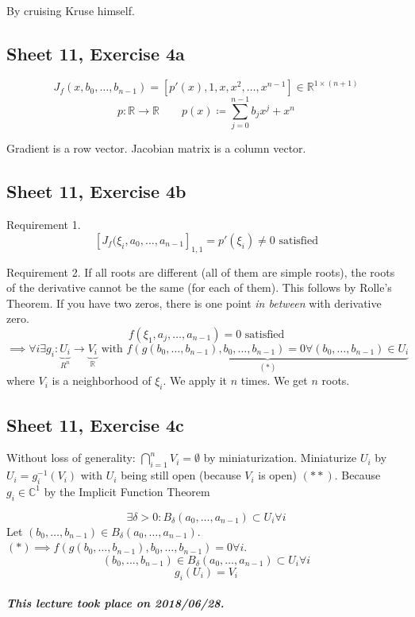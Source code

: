 \documentclass{article}
\newcommand{\dateref}[1]{\paragraph{\textit{This lecture took place on #1.}}}
\begin{document}
By cruising Kruse himself.

\subsection{Sheet 11, Exercise 4a}
\[ J_f(x, b_0, \dots, b_{n-1}) = \left[p'(x), 1, x, x^2, \dots, x^{n-1}\right] \in \mathbb R^{1 \times (n+1)} \]
\[ p: \mathbb R \to \mathbb R \qquad p(x) \coloneqq \sum_{j=0}^{n-1} b_j x^j + x^n \]

Gradient is a row vector. Jacobian matrix is a column vector.

\subsection{Sheet 11, Exercise 4b}
Requirement 1.
\[ \left[J_f(\xi_i, a_0, \dots, a_{n-1}\right]_{1,1} = p'(\xi_i) \neq 0 \text{ satisfied} \]

Requirement 2.
If all roots are different (all of them are simple roots), the roots of the derivative cannot be the same (for each of them). This follows by Rolle's Theorem. If you have two zeros, there is one point \emph{in between} with derivative zero.
\[ f(\xi_1, a_j, \dots, a_{n-1}) = 0 \text{ satisfied} \]
\[ \implies \forall i \exists g_i: \underbrace{U_i}_{R^n} \to \underbrace{V_i}_{\mathbb R} \text{ with } \underbrace{f(g(b_0, \dots, b_{n-1}), b_0, \dots, b_{n-1}) = 0 \forall (b_0, \dots, b_{n-1}) \in U_i}_{(*)} \]
where $V_i$ is a neighborhood of $\xi_i$.
We apply it $n$ times. We get $n$ roots.

\subsection{Sheet 11, Exercise 4c}

Without loss of generality: $\bigcap_{i=1}^n V_i = \emptyset$ by miniaturization.
Miniaturize $U_i$ by $U_i = g_i^{-1}(V_i)$ with $U_i$ being still open (because $V_i$ is open) $(**)$.
Because $g_i \in \mathbb C^{1}$ by the Implicit Function Theorem

\[ \exists \delta > 0: B_{\delta}(a_0, \dots, a_{n-1}) \subset U_i \forall i \]
Let $(b_0, \dots, b_{n-1}) \in B_{\delta}(a_0, \dots, a_{n-1})$. $(*) \implies f(g(b_0, \dots, b_{n-1}), b_0, \dots, b_{n-1}) = 0 \forall i$.
\[ (b_0, \dots, b_{n-1}) \in B_{\delta}(a_0, \dots, a_{n-1}) \subset U_i \forall i \]
\[ g_i(U_i) = V_i \]

\dateref{2018/06/28}
\end{document}
